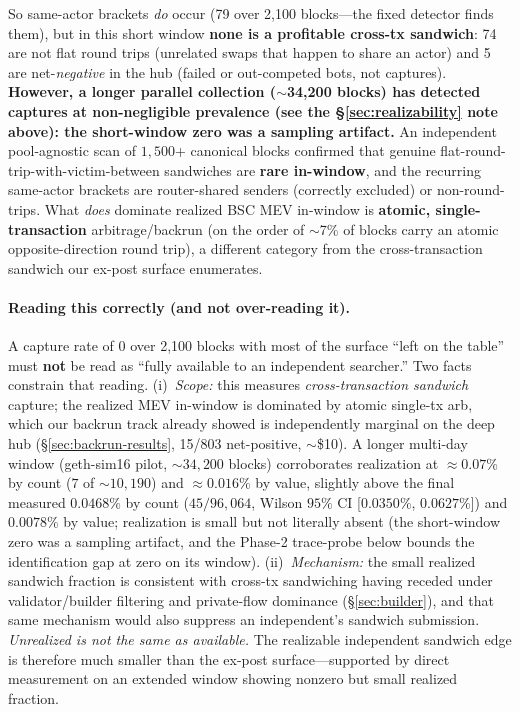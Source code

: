\documentclass[11pt]{article}
\begin{document}
\noindent So same-actor brackets \emph{do} occur (79 over 2{,}100 blocks---the fixed
detector finds them), but in this short window \textbf{none is a profitable cross-tx
sandwich}: 74 are not flat round trips (unrelated swaps that happen to share an actor)
and 5 are net-\emph{negative} in the hub (failed or out-competed bots, not captures).
\textbf{However, a longer parallel collection ($\sim$34{,}200 blocks) has detected
captures at non-negligible prevalence (see the \S\ref{sec:realizability} note above): the
short-window zero was a sampling artifact.} An independent pool-agnostic scan of
$1{,}500$+ canonical blocks confirmed that genuine
flat-round-trip-with-victim-between sandwiches are \textbf{rare in-window}, and the
recurring same-actor brackets are router-shared
senders (correctly excluded) or non-round-trips. What \emph{does} dominate realized
BSC MEV in-window is \textbf{atomic, single-transaction} arbitrage/backrun (on the
order of $\sim$7\% of blocks carry an atomic opposite-direction round trip), a
different category from the cross-transaction sandwich our ex-post surface enumerates.

\paragraph{Reading this correctly (and not over-reading it).} A capture rate of 0 over
2{,}100 blocks with most of the surface ``left on the table'' must \textbf{not} be read as
``fully available to an independent searcher.'' Two facts constrain that reading.
(i)~\emph{Scope:} this measures \emph{cross-transaction sandwich} capture; the realized
MEV in-window is dominated by atomic single-tx arb, which our backrun track already showed
is independently marginal on the deep hub (\S\ref{sec:backrun-results}, 15/803
net-positive, $\sim$\$10). A longer multi-day window (geth-sim16 pilot,
$\sim$$34{,}200$ blocks) corroborates realization at $\approx$$0.07\%$ by
count ($7$ of $\sim$$10{,}190$) and $\approx$$0.016\%$ by value, slightly above the final
measured $0.0468\%$ by count ($45/96{,}064$, Wilson $95\%$ CI [$0.0350\%$,
$0.0627\%$]) and $0.0078\%$ by value; realization is small but not literally absent (the short-window
zero was a sampling artifact, and the Phase-2 trace-probe below bounds the
identification gap at zero on its window). (ii)~\emph{Mechanism:} the small realized sandwich fraction is
consistent with cross-tx sandwiching having receded under validator/builder filtering and
private-flow dominance (\S\ref{sec:builder}), and that same mechanism would also suppress
an independent's sandwich submission. \emph{Unrealized is not the same as
available.} The realizable independent sandwich edge is therefore much smaller than the
ex-post surface---supported by direct measurement on an extended window showing nonzero
but small realized fraction.
\end{document}
